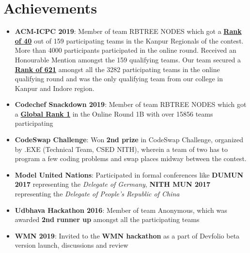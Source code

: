 \documentclass[a4paper,timesnewroman,11pt, twoside]{article}
\numberwithin{equation}{section}
\newcommand{\resumeItem}[2]{
  \item\small{
    \textbf{#1}{: #2 \vspace{-5pt}}
  }
}
\newcommand{\resumeSubItem}[2]{\resumeItem{#1}{#2}\vspace{-3pt}}
\newcommand{\resumeSubHeadingListStart}{\begin{itemize}[leftmargin=*]}
\newcommand{\resumeSubHeadingListEnd}{\end{itemize}}
\begin{document}
\section{Achievements}
  \resumeSubHeadingListStart
    \resumeSubItem{ACM-ICPC 2019}
      {Member of team RBTREE NODES which got a \href{https://www.codechef.com/public/rankings/ACM18KOL}{\textbf{Rank of 40}} out of 159 participating teams in the Kanpur Regionals of the contest. More than 4000 participants participated in the online round. Received an Honourable Mention amongst the 159 qualifying teams. Our team secured a \href{https://www.codechef.com/rankings/ACMIND18}{\textbf{Rank of 621}} amongst all the 3282 participating teams in the online qualifying round and was the only qualifying team from our college in Kanpur and Indore region.}
    \resumeSubItem{Codechef Snackdown 2019}
      {Member of team RBTREE NODES which got a \href{https://www.codechef.com/rankings/SNCK1B19?order=asc&search=rbtree&sortBy=rank}{\textbf{Global Rank 1}} in the Online Round 1B with over 15856 teams participating}
    \resumeSubItem{CodeSwap Challenge}
    {
      Won \textbf{2nd prize} in CodeSwap Challenge, organized by .EXE (Technical Team, CSED NITH), wherein a team of two has to program a few coding problems and swap places midway between the contest.
    }
    \resumeSubItem{Model United Nations}
      {Participated in formal conferences like \textbf{DUMUN 2017} representing the {\textit{Delegate of Germany}}, \textbf{NITH MUN 2017} representing the \textit{ Delegate of People's Republic of China} }
    \resumeSubItem{Udbhava Hackathon 2016}
      {Member of team Anonymous, which was awarded {\textbf{2nd runner up}} amongst all the participating teams}
    \resumeSubItem{WMN 2019}
      {Invited to the \textbf{WMN hackathon} as a part of Devfolio beta version launch, discussions and review}
  \resumeSubHeadingListEnd

\end{document}
